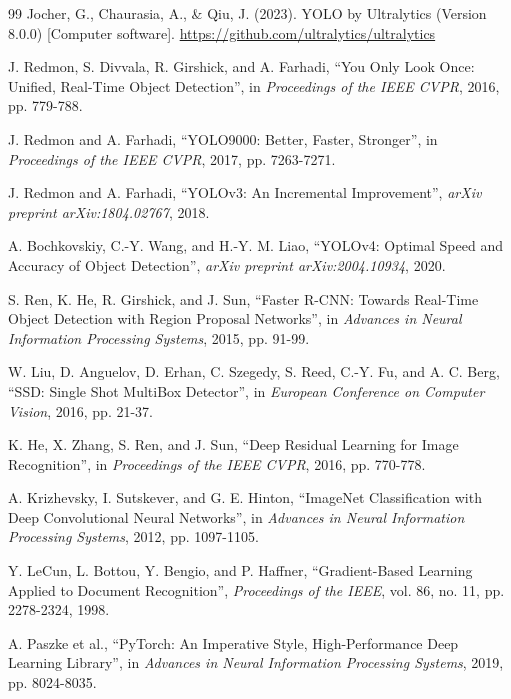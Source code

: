 \documentclass[12pt,a4paper]{report}
\begin{document}
\singlespace
{}
\begingroup
\small
\setlength{\itemsep}{0.15\baselineskip}
\setlength{\parsep}{0pt}
\setlength{\parskip}{0pt}
\begin{thebibliography}{99}
    Jocher, G., Chaurasia, A., \& Qiu, J. (2023). YOLO by Ultralytics (Version 8.0.0) [Computer software]. \url{https://github.com/ultralytics/ultralytics}
    
    J. Redmon, S. Divvala, R. Girshick, and A. Farhadi, ``You Only Look Once: Unified, Real-Time Object Detection'', in \textit{Proceedings of the IEEE CVPR}, 2016, pp. 779-788.
    
    J. Redmon and A. Farhadi, ``YOLO9000: Better, Faster, Stronger'', in \textit{Proceedings of the IEEE CVPR}, 2017, pp. 7263-7271.
    
    J. Redmon and A. Farhadi, ``YOLOv3: An Incremental Improvement'', \textit{arXiv preprint arXiv:1804.02767}, 2018.
    
    A. Bochkovskiy, C.-Y. Wang, and H.-Y. M. Liao, ``YOLOv4: Optimal Speed and Accuracy of Object Detection'', \textit{arXiv preprint arXiv:2004.10934}, 2020.
    
    S. Ren, K. He, R. Girshick, and J. Sun, ``Faster R-CNN: Towards Real-Time Object Detection with Region Proposal Networks'', in \textit{Advances in Neural Information Processing Systems}, 2015, pp. 91-99.
    
    W. Liu, D. Anguelov, D. Erhan, C. Szegedy, S. Reed, C.-Y. Fu, and A. C. Berg, ``SSD: Single Shot MultiBox Detector'', in \textit{European Conference on Computer Vision}, 2016, pp. 21-37.
    
    K. He, X. Zhang, S. Ren, and J. Sun, ``Deep Residual Learning for Image Recognition'', in \textit{Proceedings of the IEEE CVPR}, 2016, pp. 770-778.
    
    A. Krizhevsky, I. Sutskever, and G. E. Hinton, ``ImageNet Classification with Deep Convolutional Neural Networks'', in \textit{Advances in Neural Information Processing Systems}, 2012, pp. 1097-1105.
    
    Y. LeCun, L. Bottou, Y. Bengio, and P. Haffner, ``Gradient-Based Learning Applied to Document Recognition'', \textit{Proceedings of the IEEE}, vol. 86, no. 11, pp. 2278-2324, 1998.
    
    A. Paszke et al., ``PyTorch: An Imperative Style, High-Performance Deep Learning Library'', in \textit{Advances in Neural Information Processing Systems}, 2019, pp. 8024-8035.
    

\end{thebibliography}
\end{document}
